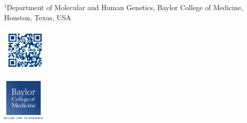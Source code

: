 \documentclass[ansiepaper, portrait, fontscale=0.35]{baposter} %
\begin{document}
\begin{poster}
{\begin{minipage}{24.5cm}
      \vspace{-0.5cm}
      \small
      $^\dagger${Department of Molecular and Human Genetics, Baylor College of Medicine, Houston, Texas, USA} \\
    \end{minipage}
    \begin{minipage}{2cm}
      \vspace{-0.5cm}
      \hspace{0.2cm}
      \includegraphics[height=2.2cm]{qrcode}
    \end{minipage}
    \begin{minipage}{1cm}
      \vspace{-0.2cm}
      \includegraphics[height=2cm]{bcm}
    \end{minipage}
    }


\end{poster}
\end{document}
